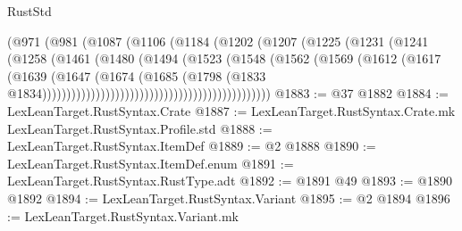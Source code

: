 \begin{lexlean}{RustStd}
\begin{coremodule}
                                              (@971
                                                (@981
                                                  (@1087
                                                    (@1106
                                                      (@1184
                                                        (@1202
                                                          (@1207
                                                            (@1225
                                                              (@1231
                                                                (@1241
                                                                  (@1258
                                                                    (@1461
                                                                      (@1480
                                                                        (@1494
                                                                          (@1523
                                                                            (@1548
                                                                              (@1562
                                                                                (@1569
                                                                                  (@1612
                                                                                    (@1617
                                                                                      (@1639
                                                                                        (@1647
                                                                                          (@1674
                                                                                            (@1685
                                                                                              (@1798
                                                                                                (@1833
                                                                                                  @1834)))))))))))))))))))))))))))))))))))))))))))))))
@1883 := @37 @1882
@1884 := LexLeanTarget.RustSyntax.Crate
@1887 := LexLeanTarget.RustSyntax.Crate.mk LexLeanTarget.RustSyntax.Profile.std
@1888 := LexLeanTarget.RustSyntax.ItemDef
@1889 := @2 @1888
@1890 := LexLeanTarget.RustSyntax.ItemDef.enum
@1891 := LexLeanTarget.RustSyntax.RustType.adt
@1892 := @1891 @49
@1893 := @1890 @1892
@1894 := LexLeanTarget.RustSyntax.Variant
@1895 := @2 @1894
@1896 := LexLeanTarget.RustSyntax.Variant.mk

\end{coremodule}
\end{lexlean}
